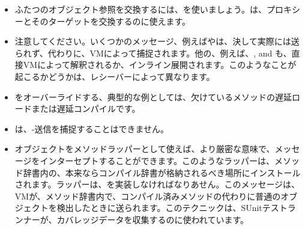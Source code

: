 \documentclass[a4paper,10pt,twoside]{book}
\begin{document}
\begin{itemize}
\item ふたつのオブジェクト参照を交換するには、を使いましょう。は、プロキシーとそのターゲットを交換するのに使えます。
\item 注意してください。いくつかのメッセージ、例えばやは、決して実際には送られず、代わりに、VMによって捕捉されます。他の、例えば、\ct{+}, \ct{-} and  も、直接VMによって解釈されるか、インライン展開されます。このようなことが起こるかどうかは、レシーバーによって異なります。%
\item {}をオーバーライドする、典型的な例としては、欠けているメソッドの遅延ロードまたは遅延コンパイルです。
\item {}は、\self-送信を捕捉することはできません。
\item オブジェクトをメソッドラッパーとして使えば、より厳密な意味で、メッセージをインターセプトすることができます。このようなラッパーは、メソッド辞書内の、本来ならコンパイル辞書が格納されるべき場所にインストールされます。ラッパーは、を実装しなければなりあせん。このメッセージは、VMが、メソッド辞書内で、コンパイル済みメソッドの代わりに普通のオブジェクトを検出したときに送られます。このテクニックは、SUnitテストランナーが、カバレッジデータを収集するのに使われています。%
\end{itemize}

\ifx\wholebook\relax\else
   
   
\end{document}
